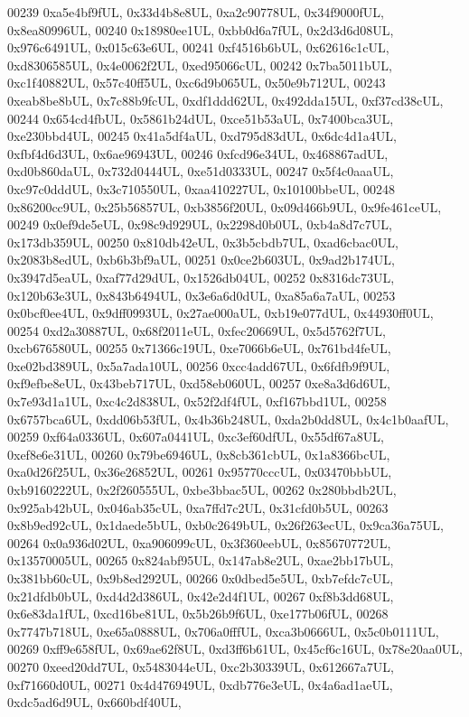 \begin{DoxyCode}
00239     0xa5e4bf9fUL, 0x33d4b8e8UL, 0xa2c90778UL, 0x34f9000fUL, 0x8ea80996UL,
00240     0x18980ee1UL, 0xbb0d6a7fUL, 0x2d3d6d08UL, 0x976c6491UL, 0x015c63e6UL,
00241     0xf4516b6bUL, 0x62616c1cUL, 0xd8306585UL, 0x4e0062f2UL, 0xed95066cUL,
00242     0x7ba5011bUL, 0xc1f40882UL, 0x57c40ff5UL, 0xc6d9b065UL, 0x50e9b712UL,
00243     0xeab8be8bUL, 0x7c88b9fcUL, 0xdf1ddd62UL, 0x492dda15UL, 0xf37cd38cUL,
00244     0x654cd4fbUL, 0x5861b24dUL, 0xce51b53aUL, 0x7400bca3UL, 0xe230bbd4UL,
00245     0x41a5df4aUL, 0xd795d83dUL, 0x6dc4d1a4UL, 0xfbf4d6d3UL, 0x6ae96943UL,
00246     0xfcd96e34UL, 0x468867adUL, 0xd0b860daUL, 0x732d0444UL, 0xe51d0333UL,
00247     0x5f4c0aaaUL, 0xc97c0dddUL, 0x3c710550UL, 0xaa410227UL, 0x10100bbeUL,
00248     0x86200cc9UL, 0x25b56857UL, 0xb3856f20UL, 0x09d466b9UL, 0x9fe461ceUL,
00249     0x0ef9de5eUL, 0x98c9d929UL, 0x2298d0b0UL, 0xb4a8d7c7UL, 0x173db359UL,
00250     0x810db42eUL, 0x3b5cbdb7UL, 0xad6cbac0UL, 0x2083b8edUL, 0xb6b3bf9aUL,
00251     0x0ce2b603UL, 0x9ad2b174UL, 0x3947d5eaUL, 0xaf77d29dUL, 0x1526db04UL,
00252     0x8316dc73UL, 0x120b63e3UL, 0x843b6494UL, 0x3e6a6d0dUL, 0xa85a6a7aUL,
00253     0x0bcf0ee4UL, 0x9dff0993UL, 0x27ae000aUL, 0xb19e077dUL, 0x44930ff0UL,
00254     0xd2a30887UL, 0x68f2011eUL, 0xfec20669UL, 0x5d5762f7UL, 0xcb676580UL,
00255     0x71366c19UL, 0xe7066b6eUL, 0x761bd4feUL, 0xe02bd389UL, 0x5a7ada10UL,
00256     0xcc4add67UL, 0x6fdfb9f9UL, 0xf9efbe8eUL, 0x43beb717UL, 0xd58eb060UL,
00257     0xe8a3d6d6UL, 0x7e93d1a1UL, 0xc4c2d838UL, 0x52f2df4fUL, 0xf167bbd1UL,
00258     0x6757bca6UL, 0xdd06b53fUL, 0x4b36b248UL, 0xda2b0dd8UL, 0x4c1b0aafUL,
00259     0xf64a0336UL, 0x607a0441UL, 0xc3ef60dfUL, 0x55df67a8UL, 0xef8e6e31UL,
00260     0x79be6946UL, 0x8cb361cbUL, 0x1a8366bcUL, 0xa0d26f25UL, 0x36e26852UL,
00261     0x95770cccUL, 0x03470bbbUL, 0xb9160222UL, 0x2f260555UL, 0xbe3bbac5UL,
00262     0x280bbdb2UL, 0x925ab42bUL, 0x046ab35cUL, 0xa7ffd7c2UL, 0x31cfd0b5UL,
00263     0x8b9ed92cUL, 0x1daede5bUL, 0xb0c2649bUL, 0x26f263ecUL, 0x9ca36a75UL,
00264     0x0a936d02UL, 0xa906099cUL, 0x3f360eebUL, 0x85670772UL, 0x13570005UL,
00265     0x824abf95UL, 0x147ab8e2UL, 0xae2bb17bUL, 0x381bb60cUL, 0x9b8ed292UL,
00266     0x0dbed5e5UL, 0xb7efdc7cUL, 0x21dfdb0bUL, 0xd4d2d386UL, 0x42e2d4f1UL,
00267     0xf8b3dd68UL, 0x6e83da1fUL, 0xcd16be81UL, 0x5b26b9f6UL, 0xe177b06fUL,
00268     0x7747b718UL, 0xe65a0888UL, 0x706a0fffUL, 0xca3b0666UL, 0x5c0b0111UL,
00269     0xff9e658fUL, 0x69ae62f8UL, 0xd3ff6b61UL, 0x45cf6c16UL, 0x78e20aa0UL,
00270     0xeed20dd7UL, 0x5483044eUL, 0xc2b30339UL, 0x612667a7UL, 0xf71660d0UL,
00271     0x4d476949UL, 0xdb776e3eUL, 0x4a6ad1aeUL, 0xdc5ad6d9UL, 0x660bdf40UL,

\end{DoxyCode}
